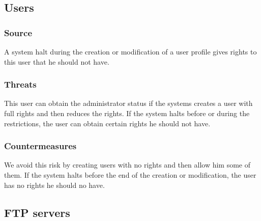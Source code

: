 \documentclass[a4paper,11pt]{article}
\begin{document}
\subsection{Users}
\subsubsection{Source}
A system halt during the creation or modification of a user profile gives rights to this user that he should not have.
\subsubsection{Threats}
This user can obtain the administrator status if the systems creates a user with full rights and then reduces the rights. If the system halts before or during the restrictions, the user can obtain certain rights he should not have.
\subsubsection{Countermeasures}
We avoid this risk by creating users with no rights and then allow him some of them. If the system halts before the end of the creation or modification, the user has no rights he should no have.  

\subsection{FTP servers}
\end{document}
